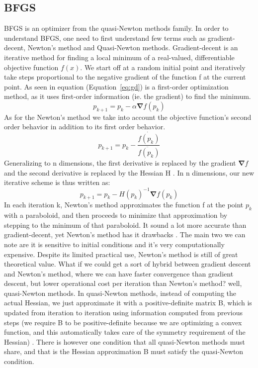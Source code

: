 \documentclass[12pt, a4paper]{article}
\newcommand{\eqnref}[1]{Equation~\ref{#1}}
\begin{document}
    \subsection{BFGS}
    BFGS is an optimizer from the quasi-Newton methods family. In order to understand BFGS, one need to first understand few terms such as gradient-decent, Newton’s method and Quasi-Newton methods. Gradient-decent is an iterative method for finding a local minimum of a real-valued, differentiable objective function $f(x)$. We start off at a random initial point and iteratively take steps proportional to the negative gradient of the function f at the current point. As seen in equation (\eqnref{eq:gd}) is a first-order optimization method, as it uses first-order information (ie. the gradient) to find the minimum.
    \begin{equation}\label{eq:gd}
    p_{k+1} = p_k -\alpha \mathbf{\nabla}f(p_k)
    \end{equation}
    As for the Newton's method we take into account the objective function’s second order behavior in addition to its first order behavior.
    \begin{equation}\label{eq:nm}
    p_{k+1} = p_k -\dfrac{\dot{f(p_k)}}{\ddot{f(p_k)}}
    \end{equation}
    Generalizing to n dimensions, the first derivative is replaced by the gradient $\mathbf{\nabla}f$ and the second derivative is replaced by the Hessian H \cite{hessian}.
    In n dimensions, our new iterative scheme is thus written as:
    \begin{equation}\label{eq:nmn}
    p_{k+1} = p_k - H(p_k)^{-1} \mathbf{\nabla}f(p_k)
    \end{equation}
    In each iteration k, Newton’s method approximates the function f at the point $p_k$ with a paraboloid, and then proceeds to minimize that approximation by stepping to the minimum of that paraboloid. It sound a lot more accurate than gradient-decent, yet Newton's method has it drawbacks \cite{NM}. The main two we can note are it is sensitive to initial conditions and it's very computationally expensive.
    Despite its limited practical use, Newton’s method is still of great theoretical value.
    What if we could get a sort of hybrid between gradient descent and Newton’s method, where we can have faster convergence than gradient descent, but lower operational cost per iteration than Newton’s method? well, quasi-Newton methods.
    In quasi-Newton methods, instead of computing the actual Hessian, we just approximate it with a positive-definite matrix B, which is updated from iteration to iteration using information computed from previous steps (we require B to be positive-definite because we are optimizing a convex function, and this automatically takes care of the symmetry requirement of the Hessian) \cite{dennis1977quasi}. There is however one condition that all quasi-Newton methods must share, and that is the Hessian approximation B must satisfy the quasi-Newton condition.
\end{document}

